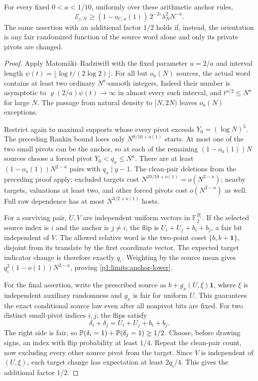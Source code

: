 \begin{proposition}
\label{p1:limits:all-anchors}
For every fixed $0<a<1/10$, uniformly over these arithmetic
anchor rules,
\begin{equation}
 \mathcal E_{\iota,N}\ge
       (1-o_{C,a}(1))\,2^{-2\iota}\lambda_N^2N^{-a}.
 \label{p1:limits:anchor-lower}
\end{equation}
The same assertion with an additional factor $1/2$ holds
if, instead, the orientation is any fair randomized
function of the source word alone and only its private
pivots are changed.
\end{proposition}
\begin{proof}
Apply Matom\"aki--Radziwi{\l}{\l}
\cite[Corollary~6]{matomakiradziwill2016} with the fixed
parameter $u=2/a$ and interval length
$\psi(t)=\lfloor\log t/(2\log2)\rfloor$.
For all but $o_a(N)$ sources, the actual word contains
at least two ordinary $N^a$-smooth integers.  Indeed
their number is asymptotic to
$\varrho(2/a)\psi(t)\to\infty$ in almost every such interval,
and $t^{a/2}\le N^a$ for large $N$.
The passage from natural density to $[N,2N)$ leaves
$o_a(N)$ exceptions.

Restrict again to maximal supports whose every pivot
exceeds $Y_0=(\log N)^5$.  The preceding Rankin bound
loses only $N^{9/10+o(1)}$ starts.  At most one of the
two small pivots can be the anchor, so at each of the
remaining $(1-o_a(1))N$ sources choose a forced pivot
$Y_0<q_x\le N^a$.  There are at least
$(1-o_a(1))N^{2-a}$ pairs with $q_x\mid y-1$.
The clean-pair deletions from the preceding proof apply:
excluded targets cost $N^{19/10+o(1)}=o(N^{2-a})$;
nearby targets, valuations at least two, and other forced
pivots cost $o(N^{2-a})$ as well.  Full raw dependence
has at most $N^{3/2+o(1)}$ hosts.

For a surviving pair, $U,V$ are independent uniform
vectors in $\mathbb F_2^{B_\iota}$.  If the selected
source index is $i$ and the anchor is $j\ne i$, the flip
is $U_i+U_j+b_i+b_j$, a fair bit independent of $V$.
The allowed relative word is the two-point coset
$\{b,b+\boldsymbol1\}$, disjoint from its translate by
the first coordinate vector.  The expected target
indicator change is therefore exactly $q_\iota$.
Weighting by the source mean gives
$q_\iota^2(1-o(1))N^{2-a}$, proving
\eqref{p1:limits:anchor-lower}.

For the final assertion, write the prescribed source as
$b+g_x(U,\xi)\boldsymbol1$, where $\xi$ is independent
auxiliary randomness and $g_x$ is fair for uniform $U$.
This guarantees the exact conditional source law even
after all nonpivot bits are fixed.  For two distinct
small-pivot indices $i,j$, the flips satisfy
\[
 \delta_i+\delta_j=U_i+U_j+b_i+b_j.
\]
The right side is fair, so
$\P(\delta_i=1)+\P(\delta_j=1)\ge1/2$.
Choose, before drawing signs, an index with flip
probability at least $1/4$.  Repeat the clean-pair count,
now excluding every other source pivot from the target.
Since $V$ is independent of $(U,\xi)$, each target
change has expectation at least $2q_\iota/4$.
This gives the additional factor $1/2$.
\end{proof}


